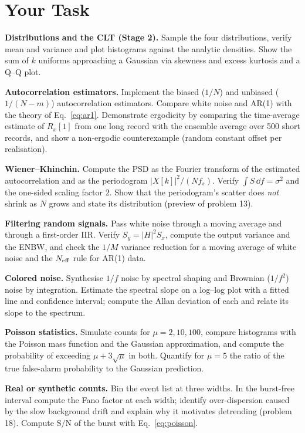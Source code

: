 \documentclass[11pt,a4paper]{article}
\begin{document}
\section*{Your Task}
\begin{tasks}
  \item \textbf{Distributions and the CLT (Stage 2).} Sample the four distributions, verify mean and variance and plot histograms against the analytic densities. Show the sum of $k$ uniforms approaching a Gaussian via skewness and excess kurtosis and a Q--Q plot.
  \item \textbf{Autocorrelation estimators.} Implement the biased ($1/N$) and unbiased ($1/(N-m)$) autocorrelation estimators. Compare white noise and AR(1) with the theory of Eq.~\eqref{eq:ar1}. Demonstrate ergodicity by comparing the time-average estimate of $R_x[1]$ from one long record with the ensemble average over 500 short records, and show a non-ergodic counterexample (random constant offset per realisation).
  \item \textbf{Wiener--Khinchin.} Compute the PSD as the Fourier transform of the estimated autocorrelation and as the periodogram $|X[k]|^2/(Nf_s)$. Verify $\int S\,\dd f=\sigma^2$ and the one-sided scaling factor $2$. Show that the periodogram's scatter does \emph{not} shrink as $N$ grows and state its distribution (preview of problem 13).
  \item \textbf{Filtering random signals.} Pass white noise through a moving average and through a first-order IIR. Verify $S_y=|H|^2S_x$, compute the output variance and the ENBW, and check the $1/M$ variance reduction for a moving average of white noise and the $N_{\rm eff}$ rule for AR(1) data.
  \item \textbf{Colored noise.} Synthesise $1/f$ noise by spectral shaping and Brownian ($1/f^2$) noise by integration. Estimate the spectral slope on a log--log plot with a fitted line and confidence interval; compute the Allan deviation of each and relate its slope to the spectrum.
  \item \textbf{Poisson statistics.} Simulate counts for $\mu=2,10,100$, compare histograms with the Poisson mass function and the Gaussian approximation, and compute the probability of exceeding $\mu+3\sqrt\mu$ in both. Quantify for $\mu=5$ the ratio of the true false-alarm probability to the Gaussian prediction.
  \item \textbf{Real or synthetic counts.} Bin the event list at three widths. In the burst-free interval compute the Fano factor at each width; identify over-dispersion caused by the slow background drift and explain why it motivates detrending (problem 18). Compute $\mathrm{S/N}$ of the burst with Eq.~\eqref{eq:poisson}.
\end{tasks}
\end{document}
